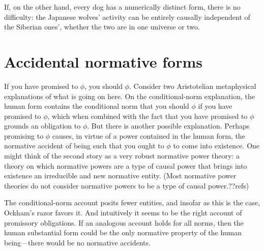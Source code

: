 If, on the other hand, every dog has a numerically distinct form,
there is no difficulty: the Japanese wolves' activity can be entirely
causally independent of the Siberian ones', whether the two are in
one universe or two.

\section{Accidental normative forms}
If you have promised to $\phi$, you should $\phi$. Consider two Aristotelian metaphysical explanations of what is going on here.
On the conditional-norm explanation, the human form contains the conditional norm that you should $\phi$ if you have promised 
to $\phi$, which when combined with the fact that you have promised to $\phi$ grounds an obligation to $\phi$. But there is
another possible explanation. Perhaps promising to $\phi$ causes, in virtue of a power contained in the human form, 
the normative accident of being such that you ought to $\phi$ to come into existence. One might think of the second story as 
a very robust normative power theory: a theory on which normative powers are a type of causal power that brings into existence
an irreducible and new normative entity. (Most normative power theories do not consider normative powers to be a type of 
causal power.??refs) 

The conditional-norm account posits fewer entities, and insofar as this is the case, Ockham's razor favors it. And intuitively
it seems to be the right account of promissory obligations. If an analogous account holds for all norms, then the human substantial form could be 
the only normative property of the human being---there would be no normative accidents.

